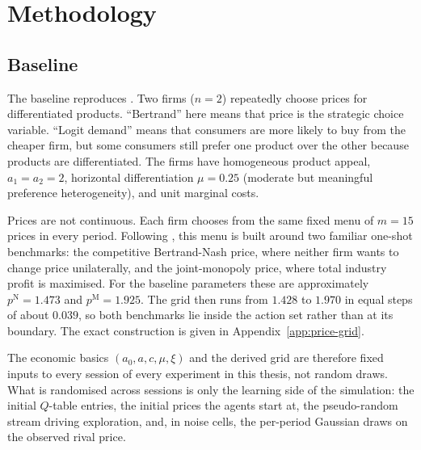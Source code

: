 \section{Methodology}
\label{sec:methodology}

\subsection{Baseline}
\label{sec:methodology-baseline}

The baseline reproduces \citet{calvano2020}. Two firms ($n=2$) repeatedly choose prices for differentiated products. ``Bertrand'' here means that price is the strategic choice variable. ``Logit demand'' means that consumers are more likely to buy from the cheaper firm, but some consumers still prefer one product over the other because products are differentiated. The firms have homogeneous product appeal, $a_1=a_2=2$, horizontal differentiation $\mu=0.25$ (moderate but meaningful preference heterogeneity), and unit marginal costs.

Prices are not continuous. Each firm chooses from the same fixed menu of $m=15$ prices in every period. Following \citet{calvano2020}, this menu is built around two familiar one-shot benchmarks: the competitive Bertrand-Nash price, where neither firm wants to change price unilaterally, and the joint-monopoly price, where total industry profit is maximised. For the baseline parameters these are approximately $p^{\mathrm{N}}=1.473$ and $p^{\mathrm{M}}=1.925$. The grid then runs from $1.428$ to $1.970$ in equal steps of about $0.039$, so both benchmarks lie inside the action set rather than at its boundary. The exact construction is given in Appendix~\ref{app:price-grid}.

The economic basics $(a_0,a,c,\mu,\xi)$ and the derived grid are therefore fixed inputs to every session of every experiment in this thesis, not random draws. What is randomised across sessions is only the learning side of the simulation: the initial $Q$-table entries, the initial prices the agents start at, the pseudo-random stream driving exploration, and, in noise cells, the per-period Gaussian draws on the observed rival price.

